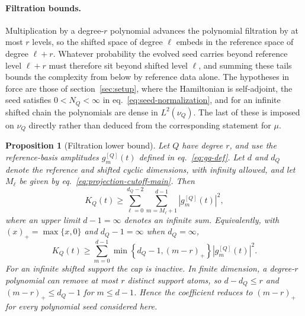 \documentclass[a4paper,11pt]{article}
\newtheorem{proposition}{Proposition}[section]
\theoremstyle{definition}
\theoremstyle{remark}
\begin{document}
\paragraph{Filtration bounds.}
Multiplication by a degree-$r$ polynomial advances the polynomial filtration by at most $r$
levels, so the shifted space of degree $\ell$ embeds in the reference space of degree $\ell+r$.
Whatever probability the evolved seed carries beyond reference level $\ell+r$ must therefore sit
beyond shifted level $\ell$, and summing these tails bounds the complexity from below by
reference data alone. The hypotheses in force are those of section~\ref{sec:setup}, where the Hamiltonian is self-adjoint,
the seed satisfies $0<N_Q<\infty$ in eq.~\eqref{eq:seed-normalization}, and for an
infinite shifted chain the polynomials are dense in $L^2(\nu_Q)$. The last of these is imposed on
$\nu_Q$ directly rather than deduced from the corresponding statement for $\mu$.
\begin{proposition}[Filtration lower bound]
\label{prop:filtration-lower-bound}
Let $Q$ have degree $r$, and use the reference-basis amplitudes
$g_m^{[Q]}(t)$ defined in eq.~\eqref{eq:gq-def}. Let $d$ and $d_Q$ denote the reference and shifted cyclic dimensions, with infinity allowed, and let $M_\ell$ be given by
eq.~\eqref{eq:projection-cutoff-main}. Then
\begin{equation}
   K_Q(t)
   \ge
   \sum_{\ell=0}^{d_Q-2}
   \sum_{m=M_\ell+1}^{d-1}
   |g_m^{[Q]}(t)|^2,
   \label{eq:filtration-lower-bound}
\end{equation}
where an upper limit $d-1=\infty$ denotes an infinite sum. Equivalently, with $(x)_+=\max\{x,0\}$ and
$d_Q-1=\infty$ when $d_Q=\infty$,
\begin{equation}
   K_Q(t)
   \ge
   \sum_{m=0}^{d-1}
   \min\!\left\{
      d_Q-1,(m-r)_+
   \right\}
   |g_m^{[Q]}(t)|^2.
   \label{eq:filtration-lower-bound-expectation}
\end{equation}
For an infinite shifted support the cap is inactive. In finite dimension, a degree-$r$ polynomial can remove at most $r$ distinct support atoms, so
$d-d_Q\le r$ and
$(m-r)_+\le d_Q-1$ for $m\le d-1$. Hence the coefficient reduces to
$(m-r)_+$ for every polynomial seed considered here.
\end{proposition}
\end{document}
